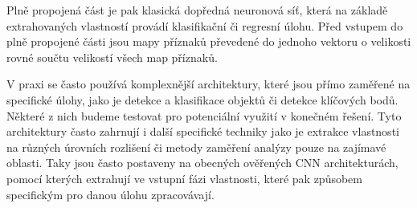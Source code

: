 Plně propojená část je pak klasická dopředná neuronová síť, která na základě
extrahovaných vlastností provádí klasifikační či regresní úlohu. Před vstupem
do plně propojené části jsou mapy příznaků převedené do jednoho vektoru o
velikosti rovné součtu velikostí všech map příznaků.

V praxi se často používá komplexnější architektury, které jsou přímo zaměřené
na specifické úlohy, jako je detekce a klasifikace objektů či detekce klíčových
bodů. Některé z nich budeme testovat pro potenciální využití v konečném řešení.
Tyto architektury často zahrnují i další specifické techniky jako je extrakce
vlastnosti na různých úrovních rozlišení či metody zaměření analýzy pouze na
zajímavé oblasti. Taky jsou často postaveny na obecných ověřených CNN
architekturách, pomocí kterých extrahují ve vstupní fázi vlastnosti, které pak
způsobem specifickým pro danou úlohu zpracovávají.

\endinput
